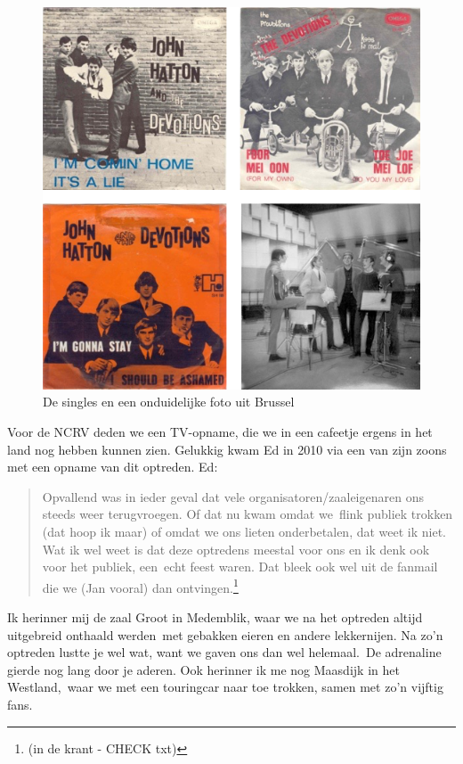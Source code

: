 \documentclass[10pt,twoside, openright]{memoir}
\begin{document}
\begin{figure}
\includegraphics[width=\textwidth]{img/ch27/4pieces}
\caption*{\footnotesize De singles en een onduidelijke foto uit Brussel}
\end{figure}

Voor de NCRV deden we een TV-opname, die we in een cafeetje ergens in het land nog hebben kunnen zien. Gelukkig kwam Ed in 2010 via een van zijn zoons met een opname van dit optreden. Ed: 

\begin{quote}
Opvallend was in ieder geval dat vele organisatoren/zaaleigenaren ons steeds weer terugvroegen. Of dat nu kwam omdat we flink publiek trokken (dat hoop ik maar) of omdat we ons lieten onderbetalen, dat weet ik niet. Wat ik wel weet is dat deze optredens meestal voor ons en ik denk ook voor het publiek, een echt feest waren. Dat bleek ook wel uit de fanmail die we (Jan vooral) dan ontvingen.\footnote{(in de krant - CHECK txt)}
\end{quote}

Ik herinner mij de zaal Groot in Medemblik, waar we na het optreden altijd uitgebreid onthaald werden met gebakken eieren en andere lekkernijen. Na zo'n optreden lustte je wel wat, want we gaven ons dan wel helemaal. De adrenaline gierde nog lang door je aderen. Ook herinner ik me nog Maasdijk in het Westland, waar we met een touringcar naar toe trokken, samen met zo'n vijftig fans. 
\end{document}
